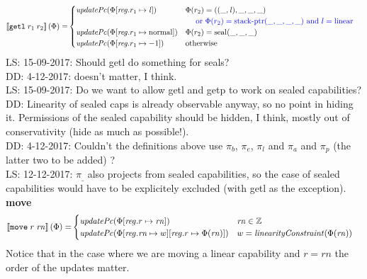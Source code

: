 \documentclass[a3paper]{article}
\newcommand\lau[1]{{\color{purple} \sf \footnotesize {LS: #1}}\\}
\newcommand\dominique[1]{{\color{purple} \sf \footnotesize {DD: #1}}\\}
\newcommand{\sem}[1]{\left\llbracket #1 \right\rrbracket}
\newcommand{\tand}{\text{ and }}
\newcommand{\tor}{\text{ or }}
\newcommand{\totherwise}{\text{otherwise }}
\newcommand{\sourcecolor}{\color{blue}}
\newcommand{\src}[1]{{\sourcecolor #1}}
\newcommand{\targetcolor}[1]{\color{black}}
\newcommand{\trg}[1]{{\targetcolor{} #1}}
\newcommand{\zinstr}[1]{\texttt{#1}}
\newcommand{\twoinstr}[3]{
  \ifthenelse{\equal{#2#3}{}}
  {\zinstr{#1}}
  {\zinstr{#1} \; #2 \; #3}
}
\newcommand{\tgetlin}[2]{\twoinstr{\trg{getl}}{#1}{#2}}
\newcommand{\tmove}[2]{\twoinstr{\trg{move}}{#1}{#2}}
\newcommand{\ints}{\mathbb{Z}}
\newcommand{\update}[2]{[#1 \mapsto #2]}
\newcommand{\updReg}[2]{\update{\reg.#1}{#2}}
\newcommand{\shareddom}[1]{\mathrm{#1}}
\newcommand{\lin}{\var{l}}
\newcommand{\stkptr}[1]{\mathrm{stack\text{-}ptr}(#1)}
\newcommand{\seal}[1]{\shareddom{seal}(#1)}
\newcommand{\var}[1]{\mathit{#1}}
\newcommand{\rn}{\var{rn}}
\newcommand{\reg}{\var{reg}}
\newcommand{\plainlinearity}[1]{\mathrm{#1}}
\newcommand{\linear}{\plainlinearity{linear}}
\newcommand{\normal}{\plainlinearity{normal}}
\newcommand{\plainfun}[2]{
  \ifthenelse{\equal{#2}{}}
  {\mathit{#1}}
  {\mathit{#1}(#2)}
}
\newcommand{\linCons}[1]{\plainfun{linearityConstraint}{#1}}
\newcommand{\updPcAddr}[1]{\plainfun{updatePc}{#1}}
\begin{document}
\begin{align*}
  \sem{\tgetlin{r_1}{r_2}}(\Phi) = & 
                                   \begin{cases}
                                     \updPcAddr{\Phi\updReg{r_1}{\lin}} & 
                                     \arraycolsep=0pt
                                     \begin{array}[t]{l}
                                       \Phi(r_2) = ((\_,\lin),\_,\_,\_) \\
                                       \quad \src{\tor \Phi(r_2) = \stkptr{\_,\_,\_,\_} \tand l = \linear}\\
                                     \end{array} \\
                                     \updPcAddr{\Phi\updReg{r_1}{\normal}} & \Phi(r_2) = \seal{\_,\_,\_}\\
                                     \updPcAddr{\Phi\updReg{r_1}{-1}} & \totherwise
                                   \end{cases}
\end{align*}
\lau{15-09-2017: Should getl do something for seals?}
\dominique{4-12-2017: doesn't matter, I think.}
\lau{15-09-2017: Do we want to allow getl and getp to work on sealed capabilities?}
\dominique{Linearity of sealed caps is already observable anyway, so no point in hiding it.  Permissions of the sealed capability should be hidden, I think, mostly out of conservativity (hide as much as possible!).}
\dominique{4-12-2017: Couldn't the definitions above use $\pi_b$, $\pi_e$, $\pi_l$ and $\pi_a$ and $\pi_p$ (the latter two to be added) ?}
\lau{12-12-2017: $\pi_\_$ also projects from sealed capabilities, so the case of sealed capabilities would have to be explicitely excluded (with getl as the exception).}


\noindent\textbf{move}\\
\begin{align*}
  \sem{\tmove{r}{\rn}}(\Phi) = & 
                              \begin{cases}
                                \updPcAddr{\Phi\updReg{r}{\rn}} & \rn \in \ints \\
                                \updPcAddr{\Phi\updReg{\rn}{w}\updReg{r}{\Phi(\rn)}} & w = \linCons{\Phi(\rn)}
                              \end{cases}
\end{align*}
Notice that in the case where we are moving a linear capability and $r = \rn$ the order of the updates matter.
\end{document}

